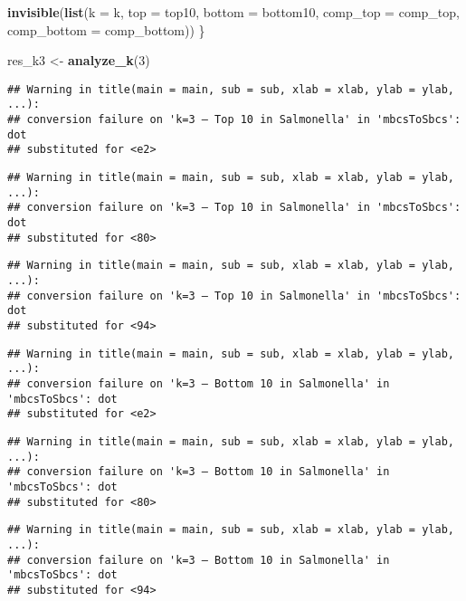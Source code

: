 \documentclass[
]{article}
\newenvironment{Shaded}{\begin{snugshade}}{\end{snugshade}}
\newcommand{\AttributeTok}[1]{\textcolor[rgb]{0.13,0.29,0.53}{#1}}
\newcommand{\DecValTok}[1]{\textcolor[rgb]{0.00,0.00,0.81}{#1}}
\newcommand{\FunctionTok}[1]{\textcolor[rgb]{0.13,0.29,0.53}{\textbf{#1}}}
\newcommand{\NormalTok}[1]{#1}
\newcommand{\OtherTok}[1]{\textcolor[rgb]{0.56,0.35,0.01}{#1}}
\begin{document}
\begin{Shaded}
\begin{Highlighting}[]
  \FunctionTok{invisible}\NormalTok{(}\FunctionTok{list}\NormalTok{(}\AttributeTok{k =}\NormalTok{ k, }\AttributeTok{top =}\NormalTok{ top10, }\AttributeTok{bottom =}\NormalTok{ bottom10,}
                 \AttributeTok{comp\_top =}\NormalTok{ comp\_top, }\AttributeTok{comp\_bottom =}\NormalTok{ comp\_bottom))}
\NormalTok{\}}

\NormalTok{res\_k3 }\OtherTok{\textless{}{-}} \FunctionTok{analyze\_k}\NormalTok{(}\DecValTok{3}\NormalTok{)}
\end{Highlighting}
\end{Shaded}

\begin{verbatim}
## Warning in title(main = main, sub = sub, xlab = xlab, ylab = ylab, ...):
## conversion failure on 'k=3 — Top 10 in Salmonella' in 'mbcsToSbcs': dot
## substituted for <e2>
\end{verbatim}

\begin{verbatim}
## Warning in title(main = main, sub = sub, xlab = xlab, ylab = ylab, ...):
## conversion failure on 'k=3 — Top 10 in Salmonella' in 'mbcsToSbcs': dot
## substituted for <80>
\end{verbatim}

\begin{verbatim}
## Warning in title(main = main, sub = sub, xlab = xlab, ylab = ylab, ...):
## conversion failure on 'k=3 — Top 10 in Salmonella' in 'mbcsToSbcs': dot
## substituted for <94>
\end{verbatim}

\begin{verbatim}
## Warning in title(main = main, sub = sub, xlab = xlab, ylab = ylab, ...):
## conversion failure on 'k=3 — Bottom 10 in Salmonella' in 'mbcsToSbcs': dot
## substituted for <e2>
\end{verbatim}

\begin{verbatim}
## Warning in title(main = main, sub = sub, xlab = xlab, ylab = ylab, ...):
## conversion failure on 'k=3 — Bottom 10 in Salmonella' in 'mbcsToSbcs': dot
## substituted for <80>
\end{verbatim}

\begin{verbatim}
## Warning in title(main = main, sub = sub, xlab = xlab, ylab = ylab, ...):
## conversion failure on 'k=3 — Bottom 10 in Salmonella' in 'mbcsToSbcs': dot
## substituted for <94>
\end{verbatim}
\end{document}
